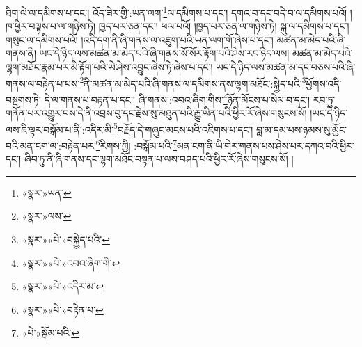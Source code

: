 ཐིག་ལེ་ལ་དམིགས་པ་དང་། འོད་ཟེར་གྱི་:ཡན་ལག་\footnote{«སྣར་»ཡན་}ལ་དམིགས་པ་དང་། དགའ་བ་དང་བདེ་བ་ལ་དམིགས་པའོ། །ཁ་ཕྱིར་བལྟས་པ་ལ་གཉིས་ཏེ། ཁྱད་པར་ཅན་དང་། ཕལ་པའོ། །ཁྱད་པར་ཅན་ལ་གཉིས་ཏེ། སྐུ་ལ་དམིགས་པ་དང་། གསུང་ལ་དམིགས་པའོ། །འདི་དག་ནི་ཞི་གནས་ལ་འཇུག་པའི་ཡན་ལག་གོ་ཞེས་པ་དང་། མཚན་མ་མེད་པའི་ཞི་གནས་ནི། ཡང་དེ་ཉིད་ལས་མཚན་མ་མེད་པའི་ཞི་གནས་སོ་སོར་རྟོག་པའི་ཤེས་རབ་ཉིད་ལས། མཚན་མ་མེད་པའི་ལྷག་མཐོང་རྣམ་པར་མི་རྟོག་པའི་ཡེ་ཤེས་འབྱུང་ཞེས་ཏེ་ཞེས་པ་དང་། ཡང་དེ་ཉིད་ལས་མཚན་མ་དང་བཅས་པའི་ཞི་གནས་ལ་བརྟེན་པ་པས་\footnote{«སྣར་»ལས་}ནི་མཚན་མ་མེད་པའི་ཞི་གནས་ལ་དམིགས་ནས་ལྷག་མཐོང་:སྐྱེད་པའི་\footnote{«སྣར་»«པེ་»བསྐྱེད་པའི་}ཕྱོགས་འདི་བསྔགས་ཏེ། དེ་ལ་གནས་པ་བརྟན་པ་དང་། ཞི་གནས་:འབའ་ཞིག་གིས་\footnote{«སྣར་»«པེ་»འབའ་ཞིག་གི་}ཉོན་མོངས་པ་སེལ་བ་དང་། རབ་ཏུ་གནོན་པར་འགྱུར་བས་དེ་ནི་འབྲས་བུ་དང་རྗེས་སུ་མཐུན་པའི་རྒྱུ་ཡིན་པའི་ཕྱིར་རོ་ཞེས་གསུངས་སོ། །ཡང་དེ་ཉིད་ལས་ཇི་ལྟར་བསྒོམ་པ་ནི་:འདིར་མི་\footnote{«སྣར་»«པེ་»འདིར་མ་}བརྗོད་དེ་གཞུང་མངས་པའི་འཇིགས་པ་དང་། བླ་མ་དམ་པས་ཉམས་སུ་མྱོང་བའི་མན་ངག་ལ་:བརྟེན་པར་\footnote{«སྣར་»«པེ་»བརྟེན་པ་}རིགས་ཀྱི། :བསྒོམ་པའི་\footnote{«པེ་»སྒོམ་པའི་}མན་ངག་ནི་ཡི་གེར་གནས་པས་ཤེས་པར་དཀའ་བའི་ཕྱིར་དང་། ཞིབ་ཏུ་ནི་ཞི་གནས་དང་ལྷག་མཐོང་བསྟན་པ་ལས་བཤད་པའི་ཕྱིར་རོ་ཞེས་གསུངས་སོ། །
